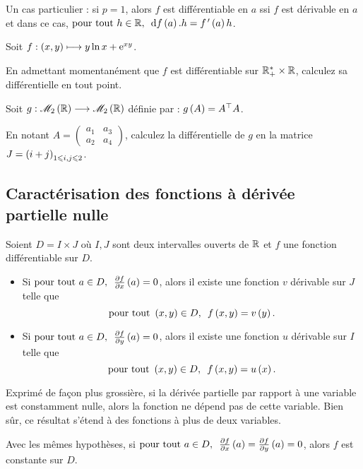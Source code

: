 Un cas particulier : si \(p=1\), alors \(f\) est différentiable en \(a\) ssi \(f\) est dérivable en \(a\) et dans ce cas, \(\quantifs{\tpt h\in\R}\odif{f}\paren{a}.h=f\prim\paren{a}h\).

\begin{exo}
Soit \(f:\left(x,y\right)\longmapsto y\ln x+\mathrm{e}^{xy}\).

En admettant momentanément que \(f\) est différentiable sur \(\mathbb{R}_+^*\times\mathbb{R}\), calculez sa différentielle en tout point.
\end{exo}

\begin{exo}
Soit \(g:\M{2}[\R]\to\M{2}[\R]\) définie par : \(g\left(A\right)=A^{\top}A\).

En notant \(A=\begin{pmatrix}
a_1 & a_3 \\
a_2 & a_4
\end{pmatrix}\), calculez la différentielle de \(g\) en la matrice \(J=\left(i+j\right)_{1\leqslant i,j\leqslant2}\).
\end{exo}

\subsection{Caractérisation des fonctions à dérivée partielle nulle}

\begin{prop}
Soient \(D=I\times J\) où \(I,J\) sont deux intervalles ouverts de \(\mathbb{R}\) et \(f\) une fonction différentiable sur \(D\).

\begin{itemize}
    \item Si \(\quantifs{\tpt a\in D}\pdv{f}{x}\paren{a}=0\), alors il existe une fonction \(v\) dérivable sur \(J\) telle que \[\quantifs{\tpt\paren{x,y}\in D}f\paren{x,y}=v\paren{y}.\]
    \item Si \(\quantifs{\tpt a\in D}\pdv{f}{y}\paren{a}=0\), alors il existe une fonction \(u\) dérivable sur \(I\) telle que \[\quantifs{\tpt\paren{x,y}\in D}f\paren{x,y}=u\paren{x}.\]
\end{itemize}
\end{prop}

Exprimé de façon plus grossière, si la dérivée partielle par rapport à une variable est constamment nulle, alors la fonction ne dépend pas de cette variable. Bien sûr, ce résultat s'étend à des fonctions à plus de deux variables.

\begin{cor}
Avec les mêmes hypothèses, si \(\quantifs{\tpt a\in D}\pdv{f}{x}\paren{a}=\pdv{f}{y}\paren{a}=0\), alors \(f\) est constante sur \(D\).
\end{cor}

